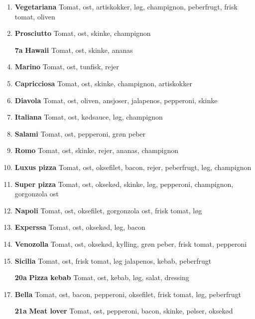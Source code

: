 \documentclass[danish,a4paper]{article}
\begin{document}
\begin{multicols}{2}
\begin{enumerate}[label={\large\textbf{\arabic*}.}]
    \item \textbf{\textcolor{vegigreen}{Vegetariana}} Tomat, ost, artiskokker, løg, champignon, peberfrugt, frisk tomat, oliven
    \item \textbf{Prosciutto} Tomat, ost, skinke, champignon 
    \item[\large\textbf{7a}] \textbf{Hawaii} Tomat, ost, skinke, ananas 
    \item \textbf{Marino} Tomat, ost, tunfisk, rejer
    \item \textbf{Capricciosa} Tomat, ost, skinke, champignon, artiskokker
    \item \textbf{Diavola} Tomat, ost, oliven, ansjoser, jalapenos, pepperoni, skinke
    \item \textbf{Italiana} Tomat, ost, kødsauce, løg, champignon 
    \item \textbf{Salami} Tomat, ost, pepperoni, grøn peber
    \item \textbf{Romo} Tomat, ost, skinke, rejer, ananas, champignon
    \item \textbf{Luxus pizza} Tomat, ost, oksefilet, bacon, rejer, peberfrugt, løg, champignon
    \item \textbf{Super pizza} Tomat, ost, oksekød, skinke, løg, pepperoni, champignon, gorgonzola ost
    \item \textbf{Napoli} Tomat, ost, oksefilet, gorgonzola ost, frisk tomat, løg
    \item \textbf{Experssa} Tomat, ost, oksekød, løg, bacon
    \setcounter{enumi}{18}
    \item \textbf{Venozolla} Tomat, ost, oksekød, kylling, grøn peber, frisk tomat, pepperoni
    \item \textbf{Sicilia} Tomat, ost, frisk tomat, løg jalapenos, kebab, peberfrugt
    \item[\large\textbf{20a}] \textbf{Pizza kebab} Tomat, ost, kebab, løg, salat, dressing
    \item \textbf{Bella} Tomat, ost, bacon, pepperoni, oksefilet, frisk tomat, løg, peberfrugt
    \item[\large\textbf{21a}] \textbf{Meat lover} Tomat, ost, pepperoni, bacon, skinke, pølser, oksekød
\end{enumerate}

\end{multicols}
\end{document}
